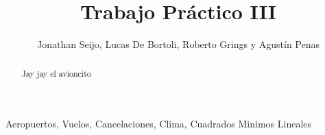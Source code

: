 \documentclass{endm}
\begin{document}
\setlength{\abovedisplayskip}{1cm}
\setlength{\belowdisplayskip}{1cm}

\begin{frontmatter}


\title{Trabajo Práctico III}

\author{Jonathan Seijo, Lucas De Bortoli, Roberto Grings y Agustín Penas}
\address{Departamento de computación\\ Universidad de Buenos Aires\\ Buenos Aires, Argentina}


\begin{abstract}
Jay jay el avioncito
\end{abstract}

\begin{keyword}
Aeropuertos, Vuelos, Cancelaciones, Clima, Cuadrados Minimos Lineales
\end{keyword}

\end{frontmatter}

\newpage


\newpage

\end{document}

